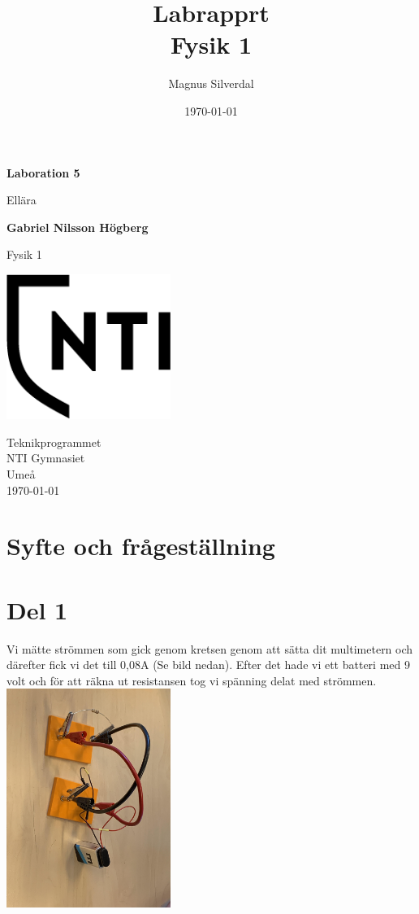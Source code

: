 \documentclass[11p]{article}
\title{Labrapprt \\ \small Fysik 1}
\author{Magnus Silverdal }
\date{\today}
\begin{document}
    \begin{titlepage}
        \begin{center}
            \vspace*{1cm}

            \Huge
            \textbf{Laboration 5}

            \vspace{0.5cm}
            \LARGE
            Ellära

            \vspace{1.5cm}

            \textbf{Gabriel Nilsson Högberg}

            \vfill


            Fysik 1

            \vspace{0.8cm}

            \includegraphics[width=0.4\textwidth]{../images/NTI Gymnasiet_Symbol_print_svart.png}

            \Large
            Teknikprogrammet\\
            NTI Gymnasiet\\
            Umeå\\
            \today

        \end{center}
    \end{titlepage}
    \section{Syfte och frågeställning}
    \section{Del 1}
    Vi mätte strömmen som gick genom kretsen genom att sätta dit multimetern och därefter fick vi det till 0,08A (Se bild nedan).
    Efter det hade vi ett batteri med 9 volt och för att räkna ut resistansen tog vi spänning delat med strömmen.
    \includegraphics[width=0.4\textwidth]{../images/BildDel1}
\end{document}
